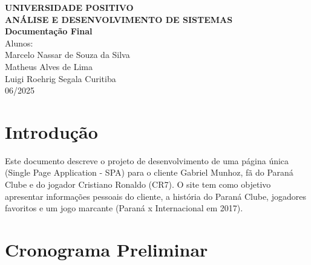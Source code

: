 \documentclass[12pt,a4paper]{article}
\begin{document}
\begin{titlepage}
    \begin{center}
        \vspace*{2.5cm}
        \textbf{UNIVERSIDADE POSITIVO}\\[0.8cm]
        \textbf{ANÁLISE E DESENVOLVIMENTO DE SISTEMAS}\\[3cm]
        \textbf{Documentação Final}\\[3cm]
        Alunos:\\[0.5cm]
        Marcelo Nassar de Souza da Silva\\[0.3cm]
        Matheus Alves de Lima\\[0.3cm]
        Luigi Roehrig Segala
        \vfill
        Curitiba\\[0.2cm]
        06/2025
    \end{center}
\end{titlepage}
\newpage

\tableofcontents
\newpage

\section{Introdução}
Este documento descreve o projeto de desenvolvimento de uma página única (Single Page Application - SPA) para o cliente Gabriel Munhoz, fã do Paraná Clube e do jogador Cristiano Ronaldo (CR7). O site tem como objetivo apresentar informações pessoais do cliente, a história do Paraná Clube, jogadores favoritos e um jogo marcante (Paraná x Internacional em 2017).

\section{Cronograma Preliminar}
\begin{table}[h!]
\centering
{}
\end{table}
\end{document}
